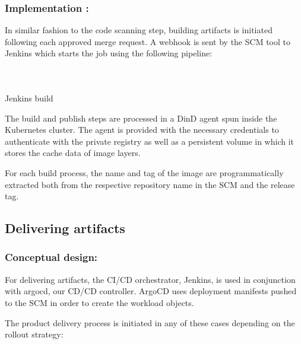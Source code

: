 \subsubsection{Implementation :}

In similar fashion to the code scanning step, building artifacts is initiated following each approved merge request. A webhook is sent by the SCM tool to Jenkins which starts the job using the following pipeline: 

\begin{listing}[H]
    \inputminted[firstline=1,lastline=40]{Dockerfile}{codeListing/Jenkinsfile_build}
\end{listing}

\begin{listing}[H]
    \inputminted[firstline=41,lastline=75]{Dockerfile}{codeListing/Jenkinsfile_build}
\end{listing}

\begin{listing}[H]
    \inputminted[firstline=76]{Dockerfile}{codeListing/Jenkinsfile_build}
    \caption{Jenkins build}
    \label{lst:jenkinsfile_build}
\end{listing}

The build and publish steps are processed in a DinD agent spun inside the Kubernetes cluster. The agent is provided with the necessary credentials to authenticate with the private registry as well as a persistent volume in which it stores the cache data of image layers. 

For each build process, the name and tag of the image are programmatically extracted both from the respective repository name in the SCM and the release tag. 

 

\subsection{Delivering artifacts }

\subsubsection{Conceptual design:}

For delivering artifacts, the CI/CD orchestrator, Jenkins, is used in conjunction with argocd, our CD/CD controller. ArgoCD uses deployment manifests pushed to the SCM in order to create the workload objects. 

The product delivery process is initiated in any of these cases depending on the rollout strategy: 

